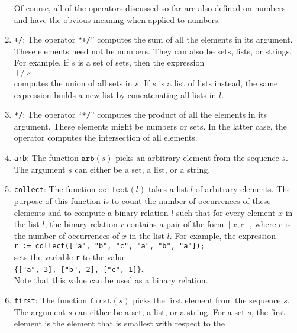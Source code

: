 \begin{enumerate}
      Of course, all of the operators discussed so far are also defined on numbers and
      have the obvious meaning when applied to numbers.
\item \texttt{+/}:  The operator ``\texttt{+/}'' computes the sum of all the elements
      in its argument.  These elements need not be numbers.  They can also be sets, lists,
      or strings.  For example, if $s$ is a set of sets, then the expression 
      \\[0.2cm]
      \hspace*{1.3cm}
      $\texttt{+/}\;s$
      \\[0.2cm]
      computes the union of all sets in $s$.  If $s$ is a list of lists instead, the same
      expression builds a new list by concatenating all lists in $l$.
\item \texttt{*/}:  The operator ``\texttt{*/}'' computes the product of all the elements
      in its argument.  These elements might be  numbers or sets.  In the latter case,
      the operator computes the intersection of all elements.
\item \texttt{arb}: The function $\texttt{arb}(s)$ picks an arbitrary element from the
      sequence $s$.  The argument $s$ can either be a set, a list, or a string.
\item \texttt{collect}: The function $\texttt{collect}(l)$ takes a list $l$ of arbitrary elements.
      The purpose of this function is to count the number of occurrences of these elements and to
      compute a binary relation $l$ such that for every element $x$ in the list $l$, the binary
      relation $r$ contains a pair of the form $[x,c]$, where $c$ is the number of occurrences of
      $x$ in the list $l$. For example, the expression
      \\[0.2cm]
      \hspace*{1.3cm}
      \texttt{r := collect(["a", "b", "c", "a", "b", "a"]);}
      \\[0.2cm]
      sets the variable \texttt{r} to the value
      \\[0.2cm]
      \hspace*{1.3cm}
      \texttt{\{["a", 3], ["b", 2], ["c", 1]\}}.
      \\[0.2cm]
      Note that this value can be used as a binary relation.
\item \texttt{first}: The function $\texttt{first}(s)$ picks the first  element from the
      sequence $s$.  The argument $s$ can either be a set, a list, or a string.
      For a set $s$, the first element is the element that is smallest with respect to the

\end{enumerate}
